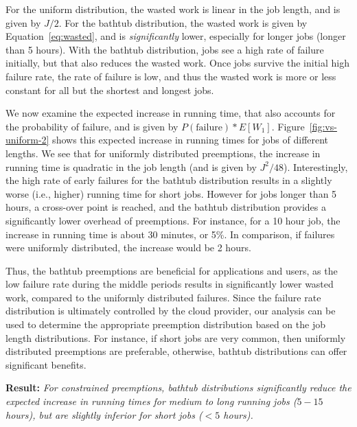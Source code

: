 For the uniform distribution, the wasted work is linear in the job length, and is given by $J/2$.
For the bathtub distribution, the wasted work is given by Equation~\ref{eq:wasted}, and is \emph{significantly} lower, especially for longer jobs (longer than 5 hours). 
With the bathtub distribution, jobs see a high rate of failure initially, but that also reduces the wasted work. 
Once jobs survive the initial high failure rate, the rate of failure is low, and thus the wasted work is more or less constant for all but the shortest and longest jobs. 



We now examine the expected increase in running time, that also accounts for the probability of failure, and is given by $P(\text{failure})*E[W_1]$. 
Figure~\ref{fig:vs-uniform-2} shows this expected increase in running times for jobs of different lengths.
We see that for uniformly distributed preemptions, the increase in running time is quadratic in the job length (and is given by $J^2/48$).
Interestingly, the high rate of early failures for the bathtub distribution results in a slightly worse (i.e., higher) running time for short jobs.
However for jobs longer than 5 hours, a cross-over point is reached, and the bathtub distribution provides a significantly lower overhead of preemptions. 
For instance, for a 10 hour job, the increase in running time is about 30 minutes, or 5\%. 
In comparison, if failures were uniformly distributed, the increase would be 2 hours. 


Thus, the bathtub preemptions are beneficial for applications and users, as the low failure rate during the middle periods results in significantly lower wasted work, compared to the uniformly distributed failures.
Since the failure rate distribution is ultimately controlled by the cloud provider, our analysis can be used to determine the appropriate preemption distribution based on the job length distributions.
For instance, if short jobs are very common, then uniformly distributed preemptions are preferable, otherwise, bathtub distributions can offer significant benefits. 

\noindent \textbf{Result:} \emph{For constrained preemptions, bathtub distributions significantly reduce the expected increase in running times for medium to long running jobs ($5-15$ hours), but are slightly inferior for short jobs ($<5$ hours).}




\vspace*{\subsecspace}
